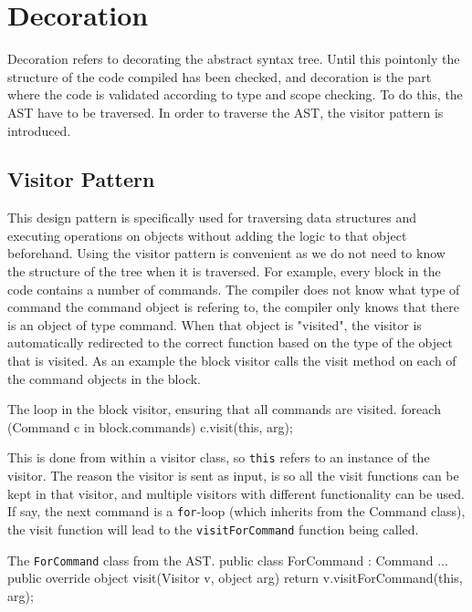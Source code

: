 \section{Decoration}
Decoration refers to decorating the abstract syntax tree. 
Until this pointonly the structure of the code compiled has been checked, and decoration is the part where the code is validated according to type and scope checking. \newline
To do this, the AST have to be traversed. In order to traverse the AST, the visitor pattern is introduced.

\subsection{Visitor Pattern}
\label{visitors}
This design pattern is specifically used for traversing data structures and executing operations on objects without adding the logic to that object beforehand. \newline
Using the visitor pattern is convenient as we do not need to know the structure of the tree when it is traversed.
For example, every block in the code contains a number of commands. 
The compiler does not know what type of command the command object is refering to, the compiler only knows that there is an object of type command. 
When that object is "visited", the visitor is automatically redirected to the correct function based on the type of the object that is visited. \newline
As an example the block visitor calls the visit method on each of the command objects in the block.
\newline
\begin{source}{The loop in the block visitor, ensuring that all commands are visited.}{}
foreach (Command c in block.commands)
  {
		c.visit(this, arg);
	}
\end{source}

This is done from within a visitor class, so \texttt{this} refers to an instance of the visitor. 
The reason the visitor is sent as input, is so all the visit functions can be kept in that visitor, and multiple visitors with different functionality can be used.
If say, the next command is a \texttt{for}-loop (which inherits from the Command class), the visit function will lead to the \texttt{visitForCommand} function being called.

\begin{source}{The \texttt{ForCommand} class from the AST.}{}
public class ForCommand : Command
    {
        ...
        public override object visit(Visitor v, object arg)
        {
            return v.visitForCommand(this, arg);
        }
    }
\end{source}

